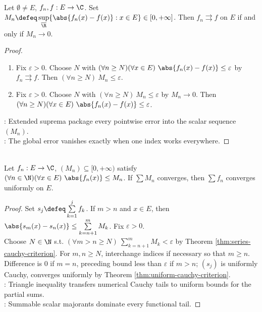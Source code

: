 \begin{theorem} \label{thm:uniform-convergence-supremum-test} \\
Let $\emptyset\ne E$, $f_n,f:E\to\C$. Set $M_n\defeq\sup\limits_{\overline{\R}}\{\abs{f_n(x)-f(x)}:x\in E\}\in[0,+\infty]$. Then $f_n\rightrightarrows f$ on $E$ if and only if $M_n\to0$.
\begin{proof}
\begin{enumerate}[label=\roman*.]
\setlength{\itemsep}{0pt}
\item[$(\Rightarrow)$] Fix $\varepsilon>0$. Choose $N$ with $(\forall n\geq N)(\forall x\in E)\ \abs{f_n(x)-f(x)}\leq\varepsilon$ by $f_n\rightrightarrows f$. Then $(\forall n\geq N)\ M_n\leq\varepsilon$.
\item[$(\Leftarrow)$] Fix $\varepsilon>0$. Choose $N$ with $(\forall n\geq N)\ M_n\leq\varepsilon$ by $M_n\to0$. Then $(\forall n\geq N)(\forall x\in E)\ \abs{f_n(x)-f(x)}\leq\varepsilon$.
\end{enumerate}
: Extended suprema package every pointwise error into the scalar sequence $(M_n)$.\\
: The global error vanishes exactly when one index works everywhere.
\end{proof}
\end{theorem}

\begin{theorem} \label{thm:weierstrass-m-test} \\
Let $f_n:E\to\C$, $(M_n)\subseteq[0,+\infty)$ satisfy $(\forall n\in\N)(\forall x\in E)\ \abs{f_n(x)}\leq M_n$. If $\sum M_n$ converges, then $\sum f_n$ converges uniformly on $E$.
\begin{proof}
Set $s_j\defeq\sum\limits_{k=1}^{j}f_k$. If $m>n$ and $x\in E$, then $\abs{s_m(x)-s_n(x)}\leq\sum\limits_{k=n+1}^{m}M_k$. Fix $\varepsilon>0$.\\
Choose $N\in\N$ s.t. $(\forall m>n\geq N)\ \sum\limits_{k=n+1}^{m}M_k<\varepsilon$ by Theorem \ref{thm:series-cauchy-criterion}. For $m,n\geq N$, interchange indices if necessary so that $m\geq n$.\\
Difference is $0$ if $m=n$, preceding bound less than $\varepsilon$ if $m>n$; $(s_j)$ is uniformly Cauchy, converges uniformly by Theorem \ref{thm:uniform-cauchy-criterion}.\\
: Triangle inequality transfers numerical Cauchy tails to uniform bounds for the partial sums.\\
: Summable scalar majorants dominate every functional tail.
\end{proof}
\end{theorem}

